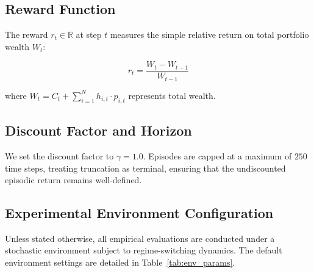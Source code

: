 \documentclass[pdflatex,sn-mathphys-num]{sn-jnl}
\begin{document}
\subsection{Reward Function}
The reward $r_t \in \mathbb{R}$ at step $t$ measures the simple relative return on total portfolio wealth $W_t$:

    $$r_t = \dfrac{W_t - W_{t-1}}{W_{t-1}}$$
        
    

where $\displaystyle W_t = C_t + \sum_{i=1}^N h_{i,t} \cdot p_{i,t}$ represents total wealth.

\subsection{Discount Factor and Horizon}
We set the discount factor to $\gamma = 1.0$. Episodes are capped at a maximum of $250$ time steps, treating truncation as terminal, ensuring that the undiscounted episodic return remains well-defined.

\subsection{Experimental Environment Configuration}
Unless stated otherwise, all empirical evaluations are conducted under a stochastic environment subject to regime-switching dynamics. The default environment settings are detailed in Table~\ref{tab:env_params}.
\end{document}
